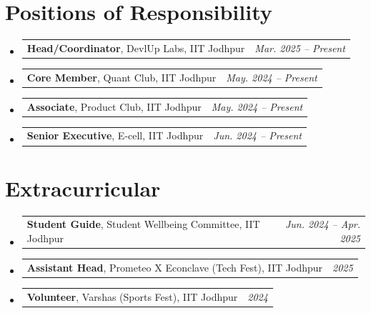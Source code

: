 \documentclass[letterpaper,10pt]{article}
\makeatletter
\newcommand{\resumePOR}[3]{
  \item
    \begin{tabular*}{0.97\textwidth}[t]{l@{\extracolsep{\fill}}r}
      \textbf{\small #1}, \small #2 & \textit{\small #3} \\
    \end{tabular*}\vspace{-7pt}
}
\newcommand{\resumeSubHeadingListStart}{\begin{itemize}[leftmargin=0.10in, label={}]}
\newcommand{\resumeSubHeadingListEnd}{\end{itemize}}
\makeatother
\begin{document}
\section{Positions of Responsibility}
  \resumeSubHeadingListStart
    \resumePOR{Head/Coordinator}{DevlUp Labs, IIT Jodhpur}{Mar. 2025 -- Present}
    \resumePOR{Core Member}{Quant Club, IIT Jodhpur}{May. 2024 -- Present}
    \resumePOR{Associate}{Product Club, IIT Jodhpur}{May. 2024 -- Present}
    \resumePOR{Senior Executive}{E-cell, IIT Jodhpur}{Jun. 2024 -- Present}
  \resumeSubHeadingListEnd

\section{Extracurricular}
  \resumeSubHeadingListStart
    \resumePOR{Student Guide}{Student Wellbeing Committee, IIT Jodhpur}{Jun. 2024 -- Apr. 2025}
    \resumePOR{Assistant Head}{Prometeo X Econclave (Tech Fest), IIT Jodhpur}{2025}
    \resumePOR{Volunteer}{Varshas (Sports Fest), IIT Jodhpur}{2024}
  \resumeSubHeadingListEnd

\end{document}
